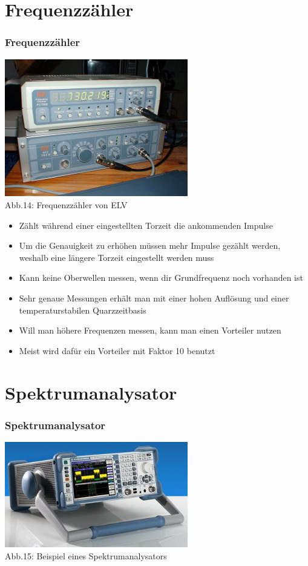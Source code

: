 \section*{Frequenzzähler}
\begin{frame}
    \frametitle{Frequenzzähler}
    \begin{center}
        \includegraphics[width=0.6\textwidth]{a16/Frequenzzaehler.jpg}\\
        Abb.14: Frequenzzähler von ELV \cite{wmen}
	\end{center}
\end{frame}

\begin{frame}
	\begin{itemize}
		\item	Zählt während einer eingestellten Torzeit die ankommenden Impulse
		\item	Um die Genauigkeit zu erhöhen müssen mehr Impulse gezählt werden, weshalb eine längere Torzeit eingestellt werden muss
		\item	Kann keine Oberwellen messen, wenn dir Grundfrequenz noch vorhanden ist
		\item	Sehr genaue Messungen erhält man mit einer hohen Auflösung und einer temperaturstabilen Quarzzeitbasis 
		\item	Will man höhere Frequenzen messen, kann man einen Vorteiler nutzen
		\item	Meist wird dafür ein Vorteiler mit Faktor 10 benutzt
	\end{itemize}
\end{frame}

\section*{Spektrumanalysator}
\begin{frame}
    \frametitle{Spektrumanalysator}
    \begin{center}
        \includegraphics[width=0.6\textwidth]{a16/Spektrumanalysator.jpg}\\
        Abb.15: Beispiel eines Spektrumanalysators \cite{wp}
	\end{center}
\end{frame}

